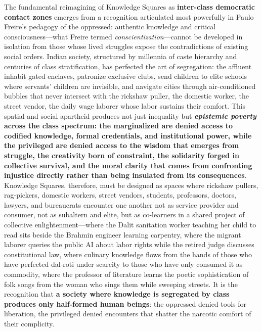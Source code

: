 The fundamental reimagining of Knowledge Squares as \textbf{inter-class
democratic contact zones} emerges from a recognition articulated most
powerfully in Paulo Freire's pedagogy of the oppressed: authentic
knowledge and critical consciousness---what Freire termed
\emph{conscientization}---cannot be developed in isolation from those
whose lived struggles expose the contradictions of existing social
orders. Indian society, structured by millennia of caste hierarchy and
centuries of class stratification, has perfected the art of segregation:
the affluent inhabit gated enclaves, patronize exclusive clubs, send
children to elite schools where servants' children are invisible, and
navigate cities through air-conditioned bubbles that never intersect
with the rickshaw puller, the domestic worker, the street vendor, the
daily wage laborer whose labor sustains their comfort. This spatial and
social apartheid produces not just inequality but
\textbf{\emph{epistemic poverty} across the class spectrum: the
marginalized are denied access to codified knowledge, formal
credentials, and institutional power, while the privileged are denied
access to the wisdom that emerges from struggle, the creativity born of
constraint, the solidarity forged in collective survival, and the moral
clarity that comes from confronting injustice directly rather than being
insulated from its consequences}. Knowledge Squares, therefore, must be
designed as spaces where rickshaw pullers, rag-pickers, domestic
workers, street vendors, students, professors, doctors, lawyers, and
bureaucrats encounter one another not as service provider and consumer,
not as subaltern and elite, but as co-learners in a shared project of
collective enlightenment---where the Dalit sanitation worker teaching
her child to read sits beside the Brahmin engineer learning carpentry,
where the migrant laborer queries the public AI about labor rights while
the retired judge discusses constitutional law, where culinary knowledge
flows from the hands of those who have perfected dal-roti under scarcity
to those who have only consumed it as commodity, where the professor of
literature learns the poetic sophistication of folk songs from the woman
who sings them while sweeping streets. It is the recognition that
\textbf{a society where knowledge is segregated by class produces only
half-formed human beings}: the oppressed denied tools for liberation,
the privileged denied encounters that shatter the narcotic comfort of
their complicity.

